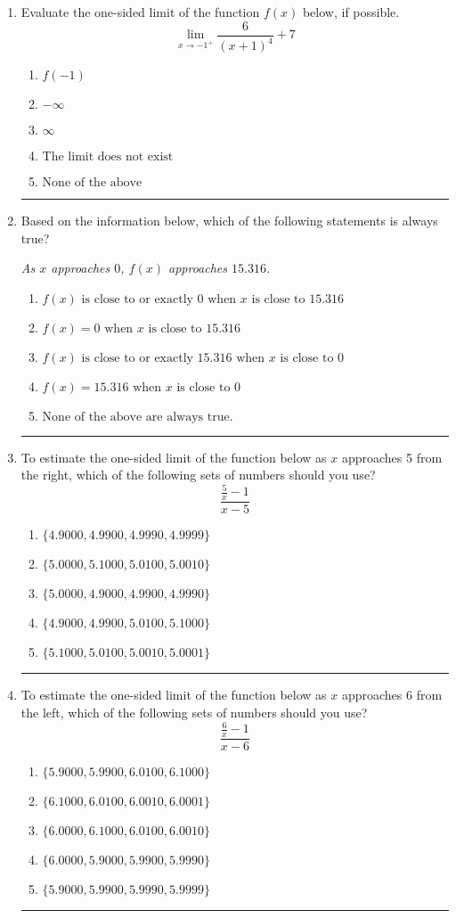\documentclass[14pt]{extbook}
\newcommand{\litem}[1]{\item#1\hspace*{-1cm}\rule{\textwidth}{0.4pt}}
\begin{document}
\begin{enumerate}
{\begin{enumerate}[label=\Alph*.]
\end{enumerate} }
\litem{
Evaluate the one-sided limit of the function $f(x)$ below, if possible.\[ \lim_{x \rightarrow -1^+} \frac{6}{(x+1)^4}+7 \]\begin{enumerate}[label=\Alph*.]
\item \( f(-1) \)
\item \( -\infty \)
\item \( \infty \)
\item \( \text{The limit does not exist} \)
\item \( \text{None of the above} \)

\end{enumerate} }
\litem{
Based on the information below, which of the following statements is always true?
\begin{center}
    \textit{ As $x$ approaches $0$, $f(x)$ approaches $15.316$. }
\end{center}
\begin{enumerate}[label=\Alph*.]
\item \( f(x) \text{ is close to or exactly } 0 \text{ when } x \text{ is close to } 15.316 \)
\item \( f(x) = 0 \text{ when } x \text{ is close to } 15.316 \)
\item \( f(x) \text{ is close to or exactly } 15.316 \text{ when } x \text{ is close to } 0 \)
\item \( f(x) = 15.316 \text{ when } x \text{ is close to } 0 \)
\item \( \text{None of the above are always true.} \)

\end{enumerate} }
\litem{
To estimate the one-sided limit of the function below as $x$ approaches 5 from the right, which of the following sets of numbers should you use?\[ \frac{\frac{5}{x} - 1}{x - 5} \]\begin{enumerate}[label=\Alph*.]
\item \( \{ 4.9000, 4.9900, 4.9990, 4.9999 \} \)
\item \( \{ 5.0000, 5.1000, 5.0100, 5.0010 \} \)
\item \( \{ 5.0000, 4.9000, 4.9900, 4.9990 \} \)
\item \( \{ 4.9000, 4.9900, 5.0100, 5.1000 \} \)
\item \( \{ 5.1000, 5.0100, 5.0010, 5.0001 \} \)

\end{enumerate} }
\litem{
To estimate the one-sided limit of the function below as $x$ approaches 6 from the left, which of the following sets of numbers should you use?\[ \frac{\frac{6}{x} - 1}{x - 6} \]\begin{enumerate}[label=\Alph*.]
\item \( \{ 5.9000, 5.9900, 6.0100, 6.1000 \} \)
\item \( \{ 6.1000, 6.0100, 6.0010, 6.0001 \} \)
\item \( \{ 6.0000, 6.1000, 6.0100, 6.0010 \} \)
\item \( \{ 6.0000, 5.9000, 5.9900, 5.9990 \} \)
\item \( \{ 5.9000, 5.9900, 5.9990, 5.9999 \} \)


\end{enumerate}}
\end{enumerate}
\end{document}

